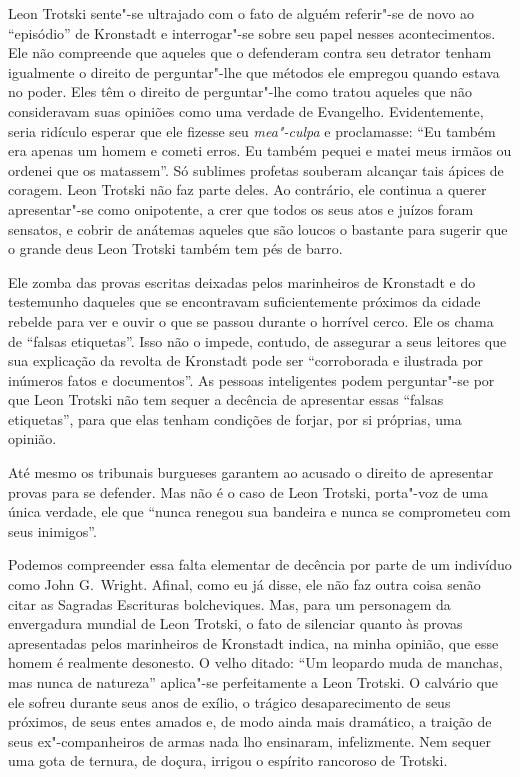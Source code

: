 Leon Trotski sente"-se ultrajado com o fato de alguém referir"-se de
novo ao “episódio” de Kronstadt e interrogar"-se sobre seu papel
nesses acontecimentos. Ele não compreende que aqueles que o defenderam
contra seu detrator tenham igualmente o direito de perguntar"-lhe que
métodos ele empregou quando estava no poder. Eles têm o direito de
perguntar"-lhe como tratou aqueles que não consideravam suas opiniões
como uma verdade de Evangelho. Evidentemente, seria ridículo esperar
que ele fizesse seu \textit{mea"-culpa} e proclamasse: “Eu também era apenas um
homem e cometi erros. Eu também pequei e matei meus irmãos ou ordenei
que os matassem”. Só sublimes profetas souberam alcançar tais ápices de
coragem. Leon Trotski não faz parte deles. Ao contrário, ele continua a
querer apresentar"-se como onipotente, a crer que todos os seus atos e
juízos foram sensatos, e cobrir de anátemas aqueles que
são loucos o bastante para sugerir que o grande deus Leon Trotski também tem
pés de barro.

Ele zomba das provas escritas deixadas pelos marinheiros de Kronstadt e do
testemunho daqueles que se encontravam suficientemente próximos da
cidade rebelde para ver e ouvir o que se passou durante o horrível
cerco. Ele os chama de “falsas etiquetas”. Isso não o impede, contudo,
de assegurar a seus leitores que sua explicação da revolta de Kronstadt
pode ser “corroborada e ilustrada por inúmeros fatos e documentos”. As
pessoas inteligentes podem perguntar"-se por que Leon Trotski não tem
sequer a decência de apresentar essas “falsas etiquetas”, para
que elas tenham condições de forjar, por si próprias, uma 
opinião.

Até mesmo os tribunais burgueses garantem ao acusado o direito de
apresentar provas para se defender. Mas não é o caso de Leon Trotski,
porta"-voz de uma única verdade, ele que “nunca renegou sua bandeira e
nunca se comprometeu com seus inimigos”.

Podemos compreender essa falta elementar de decência por parte de um
indivíduo como John G.~Wright. Afinal, como eu já disse, ele não
faz outra coisa senão citar as Sagradas Escrituras bolcheviques. Mas,
para um personagem da envergadura mundial de Leon Trotski, o fato de
silenciar quanto às provas apresentadas pelos marinheiros de Kronstadt
indica, na minha opinião, que esse homem é realmente desonesto. O velho
ditado: “Um leopardo muda de manchas, mas nunca de natureza” aplica"-se
perfeitamente a Leon Trotski. O calvário que ele sofreu durante seus
anos de exílio, o trágico desaparecimento de seus próximos, de seus
entes amados e, de modo ainda mais dramático, a traição de seus
ex"-companheiros de armas nada lho ensinaram, infelizmente. Nem sequer
uma gota de ternura, de doçura, irrigou o espírito rancoroso de
Trotski.

